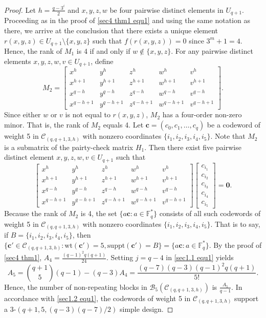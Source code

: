 \documentclass[sn-mathphys-num]{sn-jnl}%
\theoremstyle{thmstyleone}%
\theoremstyle{thmstyletwo}%
\theoremstyle{thmstylethree}%
\begin{document}
\begin{proof}
	Let $h=\frac{q-3^i}{2}$ and $x,y,z,w$ be four pairwise distinct elements in $U_{q+1}$. Proceeding as in the proof of \cref{sec4 thm1 equ1} and using the same notation as there, we arrive at the conclusion that there exists a unique element $r(x,y,z)\in U_{q+1}\setminus\{x,y,z\}$ such that $f(r(x,y,z))=0$ since $3^m+1=4$. Hence, the rank of $M_1$ is 4 if and only if $w\notin \{x,y,z\}$. For any pairwise distinct elements $x,y,z,w,v\in U_{q+1}$, define
	\begin{equation*}
		M_2=\left[\begin{array}{lllll}x^{h}&y^{h}&z^{h}&w^{h}&v^{h}\\x^{h+1}&y^{h+1}&z^{h+1}&w^{h+1}&v^{h+1}\\x^{q-h}&y^{q-h}&z^{q-h}&w^{q-h}&v^{q-h}\\x^{q-h+1}&y^{q-h+1}&z^{q-h+1}&w^{q-h+1}&v^{q-h+1}\end{array}\right].
	\end{equation*}
	Since either $w$ or $v$ is not equal to $r(x,y,z)$, $M_2$ has a four-order non-zero minor. That is, the rank of $M_2$ equals 4. Let $\mathbf{c}=(c_{0},c_{1},\ldots,c_{q})$ be a codeword of weight 5 in $\mathcal{C}_{(q,q+1,3,h)}$ with nonzero coordinates $\{i_{1},i_{2},i_{3},i_{4},i_5\}$. Note that $M_2$ is a submatrix of the pairty-check matrix $H_1$. Then there exist five pairwise distinct element $x,y,z,w,v \in U_{q+1}$ such that
	\begin{equation*}
		\left[\begin{array}{lllll}x^{h}&y^{h}&z^{h}&w^{h}&v^{h}\\x^{h+1}&y^{h+1}&z^{h+1}&w^{h+1}&v^{h+1}\\x^{q-h}&y^{q-h}&z^{q-h}&w^{q-h}&v^{q-h}\\x^{q-h+1}&y^{q-h+1}&z^{q-h+1}&w^{q-h+1}&v^{q-h+1}\end{array}\right]\left.\left[\begin{array}{c}c_{i_1}\\c_{i_2}\\c_{i_3}\\c_{i_4}\\c_{i_5}\end{array}\right.\right]=\mathbf{0}.
	\end{equation*}
	Because the rank of $M_2$ is 4, the set $\{a\mathbf{c}:a\in \mathbb{F}_{q}^\ast\}$ consists of all such codewords of weight 5 in $\mathcal{C}_{(q,q+1,3,h)}$ with nonzero coordinates $\{i_{1},i_{2},i_{3},i_{4},i_5\}$. That is to say, if $B=\{i_{1},i_{2},i_{3},i_{4},i_5\}$, then $\{\mathbf{c}'\in\mathcal{C}_{(q,q+1,3,h)} : \mathrm{wt}(\mathbf{c}')=5, \mathrm{suppt}(\mathbf{c}')=B\}=\{a\mathbf{c}:a\in \mathbb{F}_{q}^\ast\}$. By the proof of \cref{sec4 thm1}, $A_4=\frac{(q-1)^2q(q+1)}{24}$. Setting $j=q-4$ in \cref{sec1.1 equ1} yields
	\begin{equation*}
		A_{5}=\binom{q+1}{5}(q-1)-(q-3)A_{4}=\frac{(q-7)(q-3)(q-1)^2q(q+1)}{5!}.
	\end{equation*}
	Hence, the number of non-repeating blocks in $\mathcal{B}_5(\mathcal{C}_{(q,q+1,3,h)})$ is $\frac{A_5}{q-1}$. In accordance with \cref{sec1.2 equ1}, the codewords of weight 5 in $\mathcal{C}_{(q,q+1,3,h)}$ support a $3$-$(q+1,5,(q-3)(q-7)/2)$ simple design. 
	

\end{proof}
\end{document}
